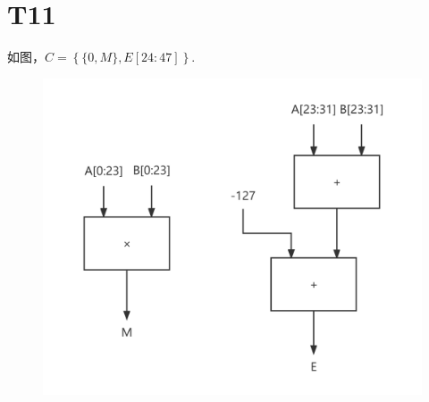 \documentclass{article}
\begin{document}
\section*{T11}如图，$C=\left\{ \{ 0,M \},E[24:47]\right\}$.
\begin{figure}[h]
    \centering
    \includegraphics[scale=0.2]{5.png}
\end{figure}
\end{document}
